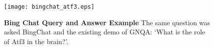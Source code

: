 \begin{figure}[h] %
	\centering
	\texttt{[image: bingchat\_atf3.eps]}
	\caption{ \textbf{Bing Chat Query and Answer Example}
    The same question was asked BingChat and the existing demo of GNQA: `What is the role of Atf3 in the brain?'. 
            }
        \label{fig:atf3-chatcomparison}
\end{figure}
